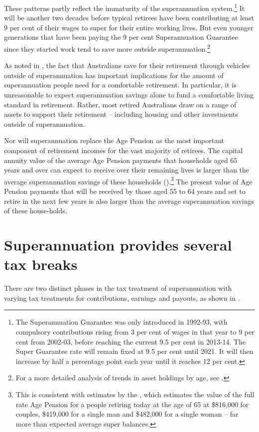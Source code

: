 These patterns partly reflect the immaturity of the superannuation system.\footnote{%
The Superannuation Guarantee was only introduced in 1992-93, with compulsory contributions rising from 3 per cent of wages in that year to 9 per cent from 2002-03, before reaching the current 9.5 per cent in 2013-14. The Super Guarantee rate will remain fixed at 9.5 per cent until 2021. It will then increase by half a percentage point each year until it reaches 12 per cent. 
} It will be another two decades before typical retirees have been contributing at least 9 per cent of their wages to super for their entire working lives. But even younger generations that have been paying the 9 per cent Superannuation Guarantee since they started work tend to save more outside superannuation.\footnote{For a more detailed analysis of trends in asset holdings by age, see \textcite[][14]{DaleyWoodWeidmannEtAl2014}.}  


As noted in , the fact that Australians save for their retirement through vehicles outside of superannuation has important implications for the amount of superannuation people need for a comfortable retirement. In particular, it is unreasonable to expect superannuation savings alone to fund a comfortable living standard in retirement. Rather, most retired Australians draw on a range of assets to support their retirement – including housing and other investments outside of superannuation. 

Nor will superannuation replace the Age Pension as the most important component of retirement incomes for the vast majority of retirees. The capital annuity value of the average Age Pension payments that households aged 65 years and over can expect to receive over their remaining lives is larger than the average superannuation savings of these households ().\footnote{This is consistent with estimates by the \textcite[][7]{ActuariesInstitute2015RetirementIncomes}, which estimates the value of the full rate Age Pension for a people retiring today at the age of 65 at \$816,000 for couples, \$419,000 for a single man and \$482,000 for a single woman – far more than expected average super balances.} The present value of Age Pension payments that will be received by those aged 55 to 64 years and set to retire in the next few years is also larger than the average superannuation savings of these house-holds. 


\section{Superannuation provides several tax breaks}
There are two distinct phases in the tax treatment of superannuation with varying tax treatments for contributions, earnings and payouts, as shown in .

